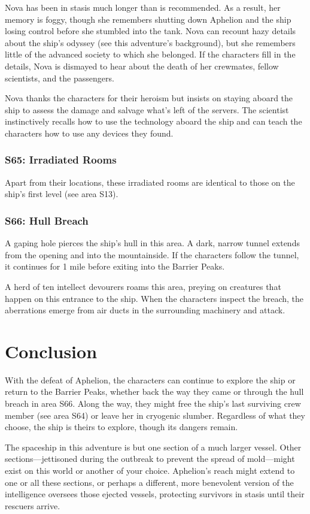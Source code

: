 \documentclass[10pt,a4paper,twoside,bg=print,twocolumn,openany,nodeprecatedcode]{dndbook}
\begin{document}
Nova has been in stasis much longer than is recommended. As a result, her memory is foggy, though she remembers shutting down Aphelion and the ship losing control before she stumbled into the tank. Nova can recount hazy details about the ship's odyssey (see this adventure's background), but she remembers little of the advanced society to which she belonged. If the characters fill in the details, Nova is dismayed to hear about the death of her crewmates, fellow scientists, and the passengers.

Nova thanks the characters for their heroism but insists on staying aboard the ship to assess the damage and salvage what's left of the servers. The scientist instinctively recalls how to use the technology aboard the ship and can teach the characters how to use any devices they found.

\subsubsection{S65: Irradiated Rooms}
Apart from their locations, these irradiated rooms are identical to those on the ship's first level (see area S13).

\subsubsection{S66: Hull Breach}
A gaping hole pierces the ship's hull in this area. A dark, narrow tunnel extends from the opening and into the mountainside. If the characters follow the tunnel, it continues for 1 mile before exiting into the Barrier Peaks.

A herd of ten intellect devourers roams this area, preying on creatures that happen on this entrance to the ship. When the characters inspect the breach, the aberrations emerge from air ducts in the surrounding machinery and attack.

\section{Conclusion}
With the defeat of Aphelion, the characters can continue to explore the ship or return to the Barrier Peaks, whether back the way they came or through the hull breach in area S66. Along the way, they might free the ship's last surviving crew member (see area S64) or leave her in cryogenic slumber. Regardless of what they choose, the ship is theirs to explore, though its dangers remain.

The spaceship in this adventure is but one section of a much larger vessel. Other sections—jettisoned during the outbreak to prevent the spread of mold—might exist on this world or another of your choice. Aphelion's reach might extend to one or all these sections, or perhaps a different, more benevolent version of the intelligence oversees those ejected vessels, protecting survivors in stasis until their rescuers arrive.
\end{document}
